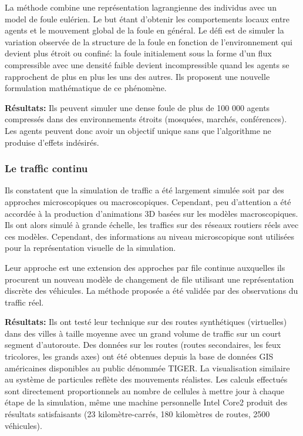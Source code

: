 \documentclass[11pt]{article}
\begin{document}
La méthode combine une représentation lagrangienne des individus avec un model de foule eulérien. Le but étant d'obtenir les comportements locaux entre agents et le mouvement global de la foule en général. Le défi est de simuler la variation observée de la structure de la foule en fonction de l'environnement qui devient plus étroit ou confiné: la foule initialement sous la forme d'un flux compressible avec une densité faible devient incompressible quand les agents se rapprochent de plus en plus les uns des autres. Ils proposent une nouvelle formulation mathématique de ce phénomène.

\textbf{Résultats:} Ils peuvent simuler une dense foule de plus de 100 000 agents compressés dans des environnements étroits (mosquées, marchés, conférences). Les agents peuvent donc avoir un objectif unique sans que l'algorithme ne produise d'effets indésirés.

\subsubsection{Le traffic continu}

Ils constatent que la simulation de traffic a été largement simulée soit par des approches microscopiques ou macroscopiques. Cependant, peu d'attention a été accordée à la production d'animations 3D basées sur les modèles macroscopiques. Ils ont alors simulé à grande échelle, les traffics sur des réseaux routiers réels avec ces modèles. Cependant, des informations au niveau microscopique sont utilisées pour la représentation visuelle de la simulation.

Leur approche est une extension des approches par file continue auxquelles ils procurent un nouveau modèle de changement de file utilisant une représentation discrète des véhicules. La méthode proposée a été validée par des observations du traffic réel.

\textbf{Résultats:} Ils ont testé leur technique sur des routes synthétiques (virtuelles) dans des villes à taille moyenne avec un grand volume de traffic sur un court segment d'autoroute. Des données sur les routes (routes secondaires, les feux tricolores, les grands axes) ont été obtenues depuis la base de données GIS américaines disponibles au public dénommée TIGER. La visualisation similaire au système de particules reflète des mouvements réalistes. Les calculs effectués sont directement proportionnels au nombre de cellules à mettre jour à chaque étape de la simulation, même une machine personnelle Intel Core2 produit des résultats satisfaisants (23 kilomètre-carrés, 180 kilomètres de routes, 2500 véhicules).
\end{document}
